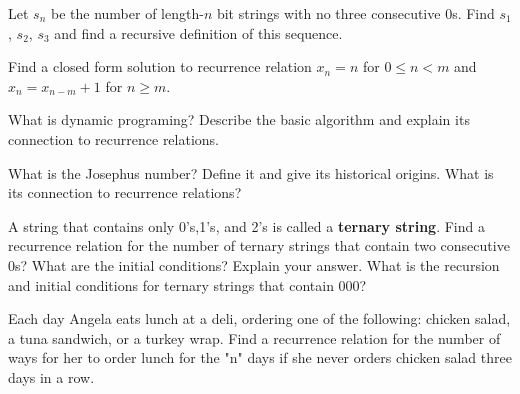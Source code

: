 

\begin{exercise} 
Let $s_n$ be the number of length-$n$ bit strings with no three consecutive 0s.  Find $s_1$, $s_2$, $s_3$ and find a recursive definition of this sequence.
\end{exercise}

\begin{exercise} 
Find a closed form solution to recurrence relation $x_n=n$ for $0 \le n < m$ and $x_n=x_{n-m}+1$ for $n \ge m$.
\end{exercise}


\begin{exercise}
What is dynamic programing?  Describe the basic algorithm and explain its connection to recurrence relations.
\end{exercise}

\begin{exercise}
What is the Josephus number?  Define it and give its historical origins.  What is its connection to recurrence relations?
\end{exercise}

\begin{exercise} 
A string that contains only 0's,1's, and 2's is called a {\bf ternary string}. Find a recurrence relation for the number of ternary strings that contain two consecutive 0s?  What are the initial conditions? Explain your answer.  What is the recursion and initial conditions for ternary strings that contain 000?
\end{exercise}

\begin{exercise}
Each day Angela eats lunch at a deli, ordering one of the following:
chicken salad, a tuna sandwich, or a turkey wrap. Find a recurrence
relation for the number of ways for her to order lunch for the "n" days
if she never orders chicken salad three days in a row. 
\end{exercise}


